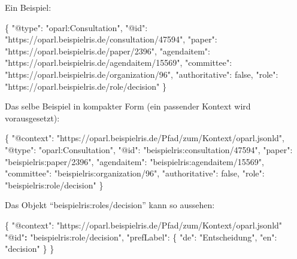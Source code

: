 \documentclass[,a4paper]{article}
\newenvironment{Shaded}{}{}
\newcommand{\DataTypeTok}[1]{\textcolor[rgb]{0.56,0.13,0.00}{{#1}}}
\newcommand{\DecValTok}[1]{\textcolor[rgb]{0.25,0.63,0.44}{{#1}}}
\newcommand{\StringTok}[1]{\textcolor[rgb]{0.25,0.44,0.63}{{#1}}}
\newcommand{\ErrorTok}[1]{\textcolor[rgb]{1.00,0.00,0.00}{\textbf{{#1}}}}
\newcommand{\NormalTok}[1]{{#1}}
\begin{document}
Ein Beispiel:

\begin{Shaded}
\begin{Highlighting}[]
\NormalTok{\{}
    \DataTypeTok{"@type"}\NormalTok{: }\StringTok{"oparl:Consultation"}\NormalTok{,}
    \DataTypeTok{"@id"}\NormalTok{: }\StringTok{"https://oparl.beispielris.de/consultation/47594"}\NormalTok{,}
    \DataTypeTok{"paper"}\NormalTok{: }\StringTok{"https://oparl.beispielris.de/paper/2396"}\NormalTok{,}
    \DataTypeTok{"agendaitem"}\NormalTok{: }\StringTok{"https://oparl.beispielris.de/agendaitem/15569"}\NormalTok{,}
    \DataTypeTok{"committee"}\NormalTok{: }\StringTok{"https://oparl.beispielris.de/organization/96"}\NormalTok{,}
    \DataTypeTok{"authoritative"}\NormalTok{: }\DecValTok{false}\NormalTok{,}
    \DataTypeTok{"role"}\NormalTok{: }\StringTok{"https://oparl.beispielris.de/role/decision"}
\NormalTok{\}}
\end{Highlighting}
\end{Shaded}

Das selbe Beispiel in kompakter Form (ein passender Kontext wird
vorausgesetzt):

\begin{Shaded}
\begin{Highlighting}[]
\NormalTok{\{}
    \DataTypeTok{"@context"}\NormalTok{: }\StringTok{"https://oparl.beispielris.de/Pfad/zum/Kontext/oparl.jsonld"}\NormalTok{,}
    \DataTypeTok{"@type"}\NormalTok{: }\StringTok{"oparl:Consultation"}\NormalTok{,}
    \DataTypeTok{"@id"}\NormalTok{: }\StringTok{"beispielris:consultation/47594"}\NormalTok{,}
    \DataTypeTok{"paper"}\NormalTok{: }\StringTok{"beispielris:paper/2396"}\NormalTok{,}
    \DataTypeTok{"agendaitem"}\NormalTok{: }\StringTok{"beispielris:agendaitem/15569"}\NormalTok{,}
    \DataTypeTok{"committee"}\NormalTok{: }\StringTok{"beispielris:organization/96"}\NormalTok{,}
    \DataTypeTok{"authoritative"}\NormalTok{: }\DecValTok{false}\NormalTok{,}
    \DataTypeTok{"role"}\NormalTok{: }\StringTok{"beispielris:role/decision"}
\NormalTok{\}}
\end{Highlighting}
\end{Shaded}

Das Objekt ``beispielris:roles/decision'' kann so aussehen:

\begin{Shaded}
\begin{Highlighting}[]
\NormalTok{\{}
    \DataTypeTok{"@context"}\NormalTok{: }\StringTok{"https://oparl.beispielris.de/Pfad/zum/Kontext/oparl.jsonld"}
    \StringTok{"@id"}\ErrorTok{:} \StringTok{"beispielris:role/decision"}\NormalTok{,}
    \DataTypeTok{"prefLabel"}\NormalTok{: \{}
        \DataTypeTok{"de"}\NormalTok{: }\StringTok{"Entscheidung"}\NormalTok{,}
        \DataTypeTok{"en"}\NormalTok{: }\StringTok{"decision"}
    \NormalTok{\}}
\NormalTok{\}}
\end{Highlighting}
\end{Shaded}
\end{document}

